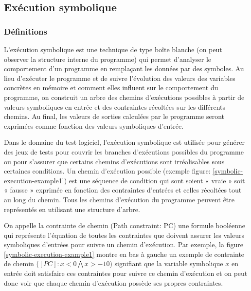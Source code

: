 \subsection{Exécution symbolique}

\subsubsection*{Définitions}
L'exécution symbolique\cite{symbolic-execution-by-king} est une technique de type boîte blanche (on peut observer la structure interne du programme) qui permet d'analyser le comportement d'un programme en remplaçant les données par des symboles. 
Au lieu d'exécuter le programme et de suivre l'évolution des valeurs des variables concrètes en mémoire et comment elles influent sur le comportement du programme, on construit un arbre des chemins d'exécutions possibles à partir de valeurs symboliques en entrée et des contraintes récoltées sur les différents chemins.
Au final, les valeurs de sorties calculées par le programme seront exprimées comme fonction des valeurs symboliques d'entrée.

Dans le domaine du test logiciel, l'exécution symbolique est utilisée pour générer des jeux de tests pour couvrir les branches d'exécutions possibles du programme ou pour s'assurer que certains chemins d'exécutions sont irréalisables sous certaines conditions.
Un chemin d'exécution possible (exemple figure: \ref{symbolic-execution-example1}) est une séquence de condition qui sont soient « vraie » soit « fausse » exprimée en fonction des contraintes d'entrées et celles récoltées tout au long du chemin. Tous les chemins d'exécution du programme peuvent être représentés en utilisant une structure d'arbre.

On appelle la contrainte de chemin (Path constraint: PC) une formule booléenne qui représente l'équation de toutes les contraintes que doivent assurer les valeurs symboliques d'entrées pour suivre un chemin d'exécution. Par exemple, la figure \ref{symbolic-execution-example1} montre en bas à gauche un exemple de contrainte de chemin ($[PC]: x < 0 \bigwedge x > -10$) signifiant que la variable symbolique $x$ en entrée doit satisfaire ces contraintes pour suivre ce chemin d'exécution et on peut donc voir que chaque chemin d'exécution possède ses propres contraintes.\\

